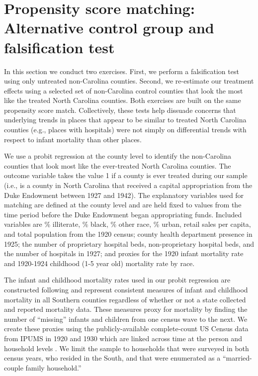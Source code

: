 \documentclass[12pt]{article}
\begin{document}

\FloatBarrier
\newpage
\section{Propensity score matching: Alternative control group and falsification test \label{sec:psm-falsification}}
\setcounter{table}{0}
\setcounter{figure}{0}


In this section we conduct two exercises. 
First, we perform a falsification test using only untreated non-Carolina counties. 
Second, we re-estimate our treatment effects using a selected set of non-Carolina control counties that look the most like the treated North Carolina counties. 
Both exercises are built on the same propensity score match. 
Collectively, these tests help dissuade concerns that underlying trends in places that appear to be similar to treated North Carolina counties (e.g., places with hospitals) were not simply on differential trends with respect to infant mortality than other places. 

We use a probit regression at the county level to identify the non-Carolina counties that look most like the ever-treated North Carolina counties. 
The outcome variable takes the value 1 if a county is ever treated during our sample (i.e., is a county in North Carolina that received a capital appropriation from the Duke Endowment between 1927 and 1942). 
The explanatory variables used for matching are defined at the county level and are held fixed to values from the time period before the Duke Endowment began appropriating funds. 
Included variables are \% illiterate, \% black, \% other race, \% urban, retail sales per capita, and total population from the 1920 census; county health department presence in 1925; the number of proprietary hospital beds, non-proprietary hospital beds, and the number of hospitals in 1927; and proxies for the 1920 infant mortality rate and 1920-1924 childhood (1-5 year old) mortality rate by race. 

The infant and childhood mortality rates used in our probit regression are constructed following  and represent consistent measures of infant and childhood mortality in all Southern counties  regardless of whether or not a state collected and reported mortality data. 
These measures proxy for mortality by finding the number of ``missing'' infants and children from one census wave to the next. 
We create these proxies using the publicly-available complete-count US Census data from IPUMS in 1920 and 1930 which are linked across time at the person and household levels . 
We limit the sample to households that were surveyed in both census years, who resided in the South, and that were enumerated as a ``married-couple family household.''
\end{document}

